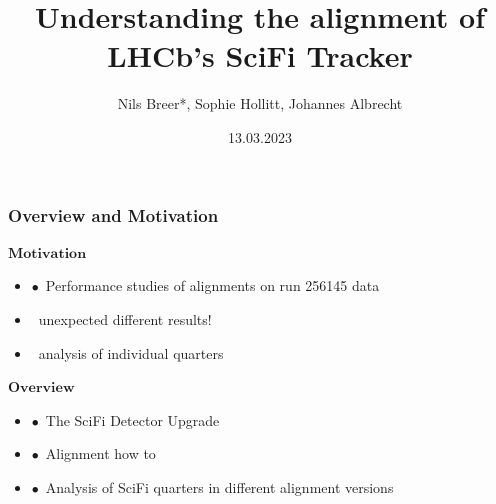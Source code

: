 \documentclass[aspectratio=1610, 12pt]{beamer}
\title{Understanding the alignment of LHCb's SciFi Tracker}
\author[N.Breer]{Nils Breer*, Sophie Hollitt, Johannes Albrecht}
\institute{TU Dortmund, Fakultät Physik}
\date{13.03.2023}
\begin{document}
\maketitle

\begin{frame}\frametitle{Overview and Motivation}
$\textbf{Motivation}$
  \begin{itemize}
    \item $\bullet$\, Performance studies of alignments on run 256145 data
    \item \to\, unexpected different results!
    \item \to\, analysis of individual quarters
  \end{itemize}
$\textbf{Overview}$
  \begin{itemize}
    \item $\bullet$\, The SciFi Detector Upgrade
    \item $\bullet$\, Alignment how to
    \item $\bullet$\, Analysis of SciFi quarters in different alignment versions
  \end{itemize}
\end{frame}

%
%
\end{document}
